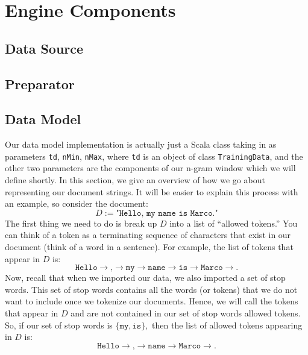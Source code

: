 \documentclass[a4paper,12pt]{article}
\renewcommand{\tt}[1]{\texttt{#1}}
\newcommand{\3}{\left}
\newcommand{\4}{\right}
\renewcommand{\-}[1]{{}^{-#1}}
\begin{document}
\section*{Engine Components}

\subsection*{Data Source}

\subsection*{Preparator}

\subsection*{Data Model}

Our data model implementation is actually just a Scala class taking in as parameters \tt{td}, \tt{nMin}, \tt{nMax}, where \tt{td} is an object of class \tt{TrainingData}, and the other two parameters are the components of our n-gram window which we will define shortly. In this section, we give an overview of how we go about representing our document strings. It will be easier to explain this process with an example, so consider the document:
$$
D := \tt{"Hello, my name is Marco."}
$$
The first thing we need to do is break up $D$ into a list of \enquote{allowed tokens.} You can think of a token as a terminating sequence of characters that exist in our document (think of a word in a sentence). For example, the list of tokens that appear in $D$ is:
$$
\tt{Hello} \to \tt{,} \to \tt{my} \to \tt{name} \to \tt{is} \to \tt{Marco} \to \tt{.}
$$
Now, recall that when we imported our data, we also imported a set of stop words. This set of stop words contains all the words (or tokens) that we do not want to include once we tokenize our documents. Hence, we will call the tokens that appear in $D$ and are not contained in our set of stop words allowed tokens. So, if our set of stop words is $\{\tt{my}, \tt{is}\},$ then the list of allowed tokens appearing in $D$ is:
$$
\tt{Hello} \to \tt{,} \to \tt{name} \to \tt{Marco} \to \tt{.}
$$
\end{document}
